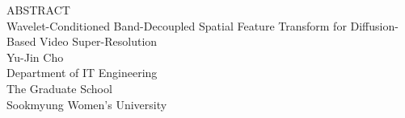 \newpage
{} %

\begin{center} {\Large{ABSTRACT}}
\vspace*{1cm}\\
\Large   Wavelet-Conditioned Band-Decoupled Spatial Feature Transform 
       for Diffusion-Based Video Super-Resolution
\vspace*{1cm}\\
\normalsize
Yu-Jin Cho\\Department of IT Engineering\\The Graduate School\\Sookmyung Women's University
\vspace*{1cm}
\end{center}





